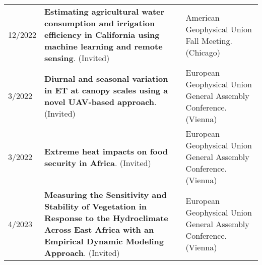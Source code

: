 \begin{longtable}{lp{9.0cm}p{4.5cm}}
12/2022 & {\bf Estimating agricultural water consumption and irrigation efficiency in California using machine learning and remote sensing}.   (Invited)  & American Geophysical Union Fall Meeting. (Chicago) \\
  
3/2022 & {\bf Diurnal and seasonal variation in ET at canopy scales using a novel UAV-based approach}.   (Invited)  & European Geophysical Union General Assembly Conference. (Vienna) \\
  
3/2022 & {\bf Extreme heat impacts on food security in Africa}.   (Invited)  & European Geophysical Union General Assembly Conference. (Vienna) \\
  
4/2023 & {\bf Measuring the Sensitivity and Stability of Vegetation in Response to the Hydroclimate Across East Africa with an Empirical Dynamic Modeling Approach}.   (Invited)  & European Geophysical Union General Assembly Conference. (Vienna) \\
 \end{longtable}

